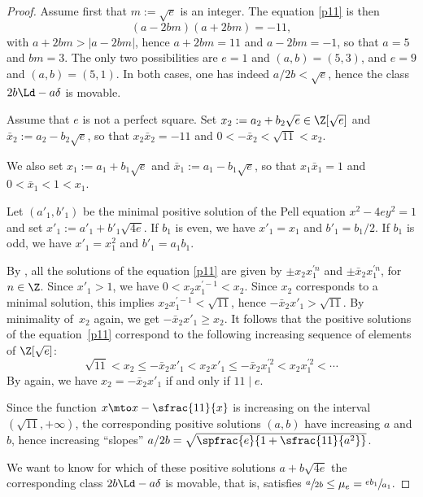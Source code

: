 \begin{proof}
Assume first that $m:=\sqrt{e}$ is an integer. The equation \eqref{p11} is then
\[
(a-2bm)(a+2bm)=-11,
\]
with $a+2bm>|a-2bm|$, hence
$a+2bm=11$ and $a-2bm=-1$, so that $a=5$ and $bm=3$. The only two possibilities are $e=1$ and $(a,b)=(5,3)$, and $e=9$ and $(a,b)=(5,1)$. In both cases, one has indeed $a/2b<\sqrt{e}$, hence the class
$2b\Ld-a\delta$ is movable.

Assume that $e$ is not a perfect square. Set
$x_2:=a_2+b_2\sqrt{e}\in\Z[\sqrt{e}]$ and $\bar x_2:=a_2-b_2\sqrt{e}$, so that $x_2\bar x_2= -11$ and $0<-\bar x_2< \sqrt{11}<x_2$.

We also set $x_1:=a_1+b_1\sqrt{e}$ and $\bar x_1:=a_1-b_1\sqrt{e}$, so that $x_1\bar x_1= 1$ and $0<\bar x_1< 1<x_1$.

Let $(a'_1,b'_1)$ be the minimal positive solution of the Pell equation $x^2-4ey^2=1$ and set $x'_1:=a'_1+b'_1\sqrt{4e}$. If $b_1$ is even, we have $x'_1=x_1$ and $b'_1=b_1/2$. If $b_1$ is odd, we have $x'_1=x_1^2$ and $b'_1=a_1b_1$.

By \cite[Th.\,110]{nage},
all the solutions of the equation \eqref{p11} are given by $\pm x_2x_1^{\prime n}$ and $\pm \bar x_2x_1^{\prime n}$, for $n\in \Z$. Since $x'_1>1$, we have $0<x_2x_1^{\prime -1}<x_2$. Since $x_2$ corresponds to a minimal solution, this implies $x_2x_1^{\prime -1}< \sqrt{11}$, hence $-\bar x_2x'_1>\sqrt{11}$. By minimality of~$x_2$ again, we get $-\bar x_2x'_1\ge x_2$. It follows that the positive solutions of the equation~\eqref{p11} correspond to the following increasing sequence of elements of $\Z[\sqrt{e}]$:
\begin{equation}\label{sols}
\sqrt{11}<x_2\le -\bar x_2x'_1<x_2x'_1\le -\bar x_2x_1^{\prime 2}<x_2x_1^{\prime 2}<\cdots
\end{equation}
By \cite[Th.\,110]{nage} again, we have $x_2= -\bar x_2x'_1$ if and only if $11\mid e$.

Since the function $x\mto x-\sfrac{11}{x}$ is increasing on the interval $(\sqrt{11},+\infty)$, the corresponding positive solutions $(a,b)$ have increasing $a$ and $b$, hence increasing ``slopes'' $a/2b=\sqrt{\spfrac{e}{ 1+\sfrac{11}{a^2}}}$.

We want to know for which of these positive solutions $a+b\sqrt{4e}$ the corresponding class $2b\Ld-a\delta$ is movable, that is, satisfies $\sfrac{a}{2b} \le \mu_e=\sfrac{eb_1}{a_1}$.


\end{proof}
